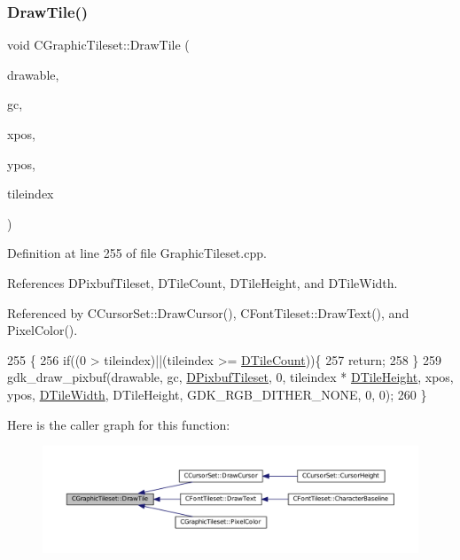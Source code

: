 \subsubsection{\texorpdfstring{Draw\+Tile()}{DrawTile()}}
{\footnotesize\ttfamily void C\+Graphic\+Tileset\+::\+Draw\+Tile (\begin{DoxyParamCaption}\item[{Gdk\+Drawable $\ast$}]{drawable,  }\item[{Gdk\+GC $\ast$}]{gc,  }\item[{gint}]{xpos,  }\item[{gint}]{ypos,  }\item[{int}]{tileindex }\end{DoxyParamCaption})}



Definition at line 255 of file Graphic\+Tileset.\+cpp.



References D\+Pixbuf\+Tileset, D\+Tile\+Count, D\+Tile\+Height, and D\+Tile\+Width.



Referenced by C\+Cursor\+Set\+::\+Draw\+Cursor(), C\+Font\+Tileset\+::\+Draw\+Text(), and Pixel\+Color().


\begin{DoxyCode}
255                                                                                                    \{
256     \textcolor{keywordflow}{if}((0 > tileindex)||(tileindex >= \hyperlink{classCGraphicTileset_a39d942b370e47f441bf97385eb1037c8}{DTileCount}))\{
257         \textcolor{keywordflow}{return};
258     \}
259     gdk\_draw\_pixbuf(drawable, gc, \hyperlink{classCGraphicTileset_a5d5adfcdbb347a6df3f57535ca08e3ef}{DPixbufTileset}, 0, tileindex * 
      \hyperlink{classCGraphicTileset_af48f32e07d5fe69afd5f764318cc3244}{DTileHeight}, xpos, ypos, \hyperlink{classCGraphicTileset_a2d0c7d19865b81911a3a43d5cae50e00}{DTileWidth}, DTileHeight, GDK\_RGB\_DITHER\_NONE, 0, 0);
260 \}
\end{DoxyCode}
Here is the caller graph for this function\+:\nopagebreak
\begin{figure}[H]
\begin{center}
\leavevmode
\includegraphics[width=350pt]{classCGraphicTileset_afefd501a74e95295b7cd2dc868dcbbcb_icgraph}
\end{center}
\end{figure}
\hypertarget{classCGraphicTileset_abf87dd71c8bf50b8878c66a5bdb2c7e7}{}\label{classCGraphicTileset_abf87dd71c8bf50b8878c66a5bdb2c7e7} 
